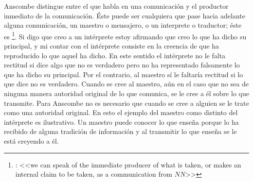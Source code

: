 Anscombe distingue entre el que habla en una comunicación y el productor
inmediato de la comunicación\autocite[Cf.~][8]{anscombe2008faith:tobelieve}.
Éste puede ser cualquiera que pase hacia adelante alguna comunicación, un
maestro o mensajero, o un interprete o traductor; éste es \footnote{\cite[8]{anscombe2008faith:tobelieve}: <<we can speak of the
  immediate producer of what is taken, or makes an internal claim to be taken,
  as a communication from $NN$>>}. Si digo que creo a un intérprete estoy
afirmando que creo lo que ha dicho su principal, y mi contar con el intérprete
consiste en la creencia de que ha reproducido lo que aquel ha dicho. En este
sentido el intérprete no le falta rectitud si dice algo que no es verdadero pero
no ha representado falsamente lo que ha dicho su principal. Por el contrario, al
maestro sí le faltaría rectitud si lo que dice no es verdadero. Cuando se cree
al maestro, aún en el caso que no sea de ninguna manera autoridad original de lo
que comunica, se le cree a él sobre lo que transmite. Para Anscombe no es
necesario que cuando se cree a alguien se le trate como una autoridad
original\autocite[Cf.~][5]{anscombe2008faith:tobelieve}. En esto el ejemplo del
maestro como distinto del intérprete es ilustrativo. Un maestro puede conocer lo
que enseña porque lo ha recibido de alguna tradición de información y al
transmitir lo que enseña se le está creyendo a él.

